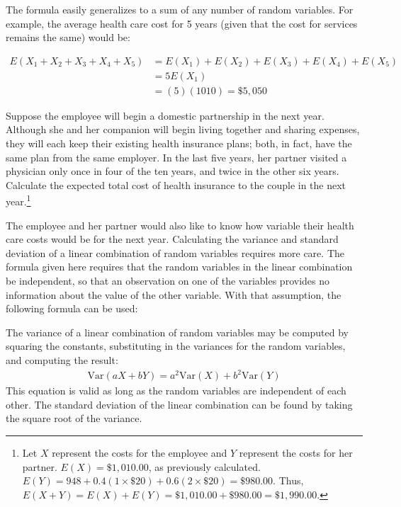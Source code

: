 The formula easily generalizes to a sum of any number of random variables. For example, the average health care cost for 5 years (given that the cost for services remains the same) would be: 

\begin{align*}
	E(X_1 + X_2 + X_3 + X_4 + X_5) &= E(X_1) + E(X_2) + E(X_3) + E(X_4) + E(X_5) \\
	         &= 5E(X_1) \\
			 &=(5)(1010) = \$5,050
\end{align*}

\begin{exercise} \label{healthCareCostsPartner}
	Suppose the employee will begin a domestic partnership in the next year. Although she and her companion will begin living together and sharing expenses, they will each keep their existing health insurance plans; both, in fact, have the same plan from the same employer. In the last five years, her partner visited a physician only once in four of the ten years, and twice in the other six years. Calculate the expected total cost of health insurance to the couple in the next year.\footnote{Let $X$ represent the costs for the employee and $Y$ represent the costs for her partner. $E(X) = \$1,010.00$, as previously calculated. $E(Y) = 948 + 0.4(1 \times \$20) + 0.6(2 \times \$20) = \$980.00$. Thus, $E(X + Y) = E(X) + E(Y) = \$1,010.00 + \$980.00 = \$1,990.00$.}
\end{exercise}

The employee and her partner would also like to know how variable their health care costs would be for the next year.  Calculating the variance and standard deviation of a linear combination of random variables requires more care.  The formula given here requires that the random variables in the linear combination be independent, so that an observation on one of the variables provides no information about the value of the other variable.  With that assumption, the following formula can be used:

\begin{termBox}{
The variance of a linear combination of random variables may be computed by squaring the constants, substituting in the variances for the random variables, and computing the result:
\begin{align*}
\text{Var}(aX + bY) = a^2 \text{Var}(X) + b^2\text{Var}(Y)
\end{align*}
This equation is valid as long as the random variables are independent of each other. The standard deviation of the linear combination can be found by taking the square root of the variance.}
\end{termBox}

